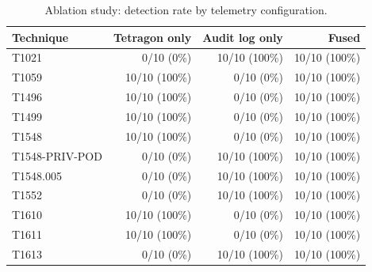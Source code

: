 \begin{table}[t]
\centering
\caption{Ablation study: detection rate by telemetry configuration.}
\label{tab:ablation}
\begin{tabular}{lrrr}
\toprule
Technique & Tetragon only & Audit log only & Fused \\
\midrule
T1021 & 0/10 (0\%) & 10/10 (100\%) & 10/10 (100\%) \\
T1059 & 10/10 (100\%) & 0/10 (0\%) & 10/10 (100\%) \\
T1496 & 10/10 (100\%) & 0/10 (0\%) & 10/10 (100\%) \\
T1499 & 10/10 (100\%) & 0/10 (0\%) & 10/10 (100\%) \\
T1548 & 10/10 (100\%) & 0/10 (0\%) & 10/10 (100\%) \\
T1548-PRIV-POD & 0/10 (0\%) & 10/10 (100\%) & 10/10 (100\%) \\
T1548.005 & 0/10 (0\%) & 10/10 (100\%) & 10/10 (100\%) \\
T1552 & 0/10 (0\%) & 10/10 (100\%) & 10/10 (100\%) \\
T1610 & 10/10 (100\%) & 0/10 (0\%) & 10/10 (100\%) \\
T1611 & 10/10 (100\%) & 0/10 (0\%) & 10/10 (100\%) \\
T1613 & 0/10 (0\%) & 10/10 (100\%) & 10/10 (100\%) \\
\bottomrule
\end{tabular}
\end{table}
